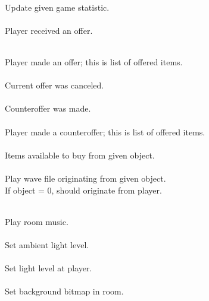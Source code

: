 \begin{protocol}
   \\
Update given game statistic. \\

   \\
Player received an offer. \\

  \\
Player made an offer; this is list of offered items. \\

 \\
Current offer was canceled. \\

  \\
Counteroffer was made. \\

  \\
Player made a counteroffer; this is list of offered items. \\

   \\
Items available to buy from given object. \\

    \\
Play wave file originating from given object. \\
If object = 0, should originate from player. \\

  \\
Play room music. \\

  \\
Set ambient light level. \\

  \\
Set light level at player. \\

  \\
Set background bitmap in room. \\


\end{protocol}
